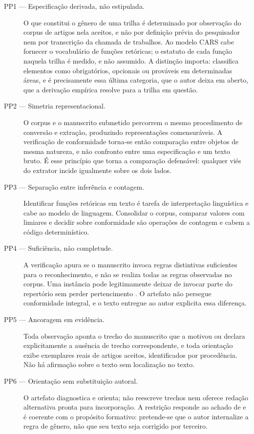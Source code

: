 \begin{description}

\item[PP1 --- Especificação derivada, não estipulada.] O que constitui o gênero de uma trilha é determinado por observação do corpus de artigos nela aceitos, e não por definição prévia do pesquisador nem por transcrição da chamada de trabalhos. Ao modelo CARS \cite{ResearchGenres} cabe fornecer o vocabulário de funções retóricas; o estatuto de cada função naquela trilha é medido, e não assumido. A distinção importa:  classifica elementos como obrigatórios, opcionais ou prováveis em determinadas áreas, e é precisamente essa última categoria, que o autor deixa em aberto, que a derivação empírica resolve para a trilha em questão.

\item[PP2 --- Simetria representacional.] O corpus e o manuscrito submetido percorrem o mesmo procedimento de conversão e extração, produzindo representações comensuráveis. A verificação de conformidade torna-se então comparação entre objetos de mesma natureza, e não confronto entre uma especificação e um texto bruto. É esse princípio que torna a comparação defensável: qualquer viés do extrator incide igualmente sobre os dois lados.

\item[PP3 --- Separação entre inferência e contagem.] Identificar funções retóricas em texto é tarefa de interpretação linguística e cabe ao modelo de linguagem. Consolidar o corpus, comparar valores com limiares e decidir sobre conformidade são operações de contagem e cabem a código determinístico.

\item[PP4 --- Suficiência, não completude.] A verificação apura se o manuscrito invoca regras distintivas suficientes para o reconhecimento, e não se realiza todas as regras observadas no corpus. Uma instância pode legitimamente deixar de invocar parte do repertório sem perder pertencimento \cite{GenresOrgComm}. O artefato não persegue conformidade integral, e o texto entregue ao autor explicita essa diferença.

\item[PP5 --- Ancoragem em evidência.] Toda observação aponta o trecho do manuscrito que a motivou ou declara explicitamente a ausência de trecho correspondente, e toda orientação exibe exemplares reais de artigos aceitos, identificados por procedência. Não há afirmação sobre o texto sem localização no texto.

\item[PP6 --- Orientação sem substituição autoral.] O artefato diagnostica e orienta; não reescreve trechos nem oferece redação alternativa pronta para incorporação. A restrição responde ao achado de  e é coerente com o propósito formativo: pretende-se que o autor internalize a regra de gênero, não que seu texto seja corrigido por terceiro.

\end{description}

